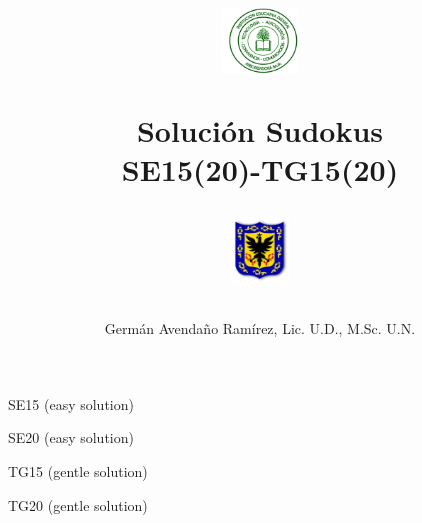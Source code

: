 \documentclass[10pt,twoside]{article}
\author{Germ\'an Avenda\~no Ram\'irez, Lic. U.D., M.Sc. U.N.}
\title{\begin{minipage}{.2\textwidth}
\includegraphics[height=1.75cm]{Images/logo-colegio.png}\end{minipage}
\begin{minipage}{.55\textwidth}
\begin{center}
Solución Sudokus\\
SE15(20)-TG15(20)
\end{center}
\end{minipage}\hfill
\begin{minipage}{.2\textwidth}
\includegraphics[height=1.75cm]{Images/logo-sed.png} 
\end{minipage}}
\date{}
\begin{document}
\cluefont{\Large}

\noindent\begin{minipage}{0.47\linewidth}\begin{center}
SE15 (easy solution) \\
\end{center}\end{minipage}
\hfill
\begin{minipage}{0.47\linewidth}\begin{center}
SE20 (easy solution) \\
\end{center}\end{minipage}

\noindent\begin{minipage}{0.47\linewidth}\begin{center}
TG15 (gentle solution) \\
\end{center}\end{minipage}
\hfill
\begin{minipage}{0.47\linewidth}\begin{center}
TG20 (gentle solution) \\
\end{center}\end{minipage}
\end{document}
